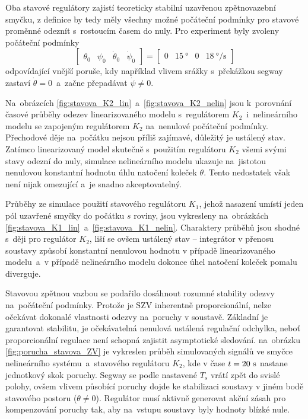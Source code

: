 \documentclass[conference]{IEEEtran}
\begin{document}
Oba stavové regulátory zajistí teoreticky stabilní uzavřenou zpětnovazební smyčku, z definice by tedy měly všechny možné počáteční
podmínky pro stavové proměnné odeznít s~rostoucím časem do nuly. Pro experiment byly zvoleny počáteční podmínky
\begin{equation*}
    \begin{bmatrix}
        \theta_0 & \psi_0 & \dot{\theta}_0 & \dot{\psi}_0
    \end{bmatrix} = \begin{bmatrix}
        0 & 15~\si{\degree} & 0 & 18~\si{\degree\per\second}
    \end{bmatrix}
\end{equation*}
odpovídající vnější poruše, kdy například vlivem srážky s~překážkou segway zastaví $\dot{\theta} = 0$~a~začne přepadávat $\dot{\psi} \neq 0$.


Na~obrázcích \ref{fig:stavova_K2_lin}~a~\ref{fig:stavova_K2_nelin}
jsou k~porovnání časové průběhy odezev linearizovaného modelu s~regulátorem $K_2$~i~nelineárního modelu se zapojeným regulátorem $K_2$ na~nenulové počáteční podmínky.
Přechodové děje na~počátku nejsou příliš zajímavé, důležitý je ustálený stav. Zatímco linearizovaný model skutečně s~použitím regulátoru $K_2$ všemi svými stavy 
odezní do nuly, simulace nelineárního modelu ukazuje na~jistotou nenulovou konstantní hodnotu úhlu natočení koleček $\theta$. Tento nedostatek však není nijak omezující
a~je snadno akceptovatelný. 


Průběhy ze simulace použití stavového regulátoru $K_1$, jehož nasazení umístí jeden pól uzavřené smyčky do počátku $s$ roviny, jsou vykresleny na~obrázkách 
\ref{fig:stavova_K1_lin}~a~\ref{fig:stavova_K1_nelin}. Charaktery průběhů jsou shodné s~ději pro regulátor $K_2$, liší se ovšem ustálený stav -- integrátor v přenosu
soustavy způsobí konstantní nenulovou hodnotu v případě linearizovaného modelu~a~v případě nelineárního modelu dokonce úhel natočení koleček pomalu diverguje.

Stavovou zpětnou vazbou se podařilo dosáhnout rozumné stability odezvy na~počáteční podmínky. Protože je SZV inherentně proporcionální, nelze očekávat
dokonalé vlastnosti odezvy na~poruchy v soustavě. Základní je garantovat stabilitu, je očekávatelná nenulová ustálená regulační odchylka,
neboť proporcionální regulace není schopná zajistit asymptotické sledování. na~obrázku \ref{fig:porucha_stavova_ZV} je vykreslen průběh simulovaných signálů ve smyčce nelineárního
systému~a~stavového regulátoru $K_2$, kde v čase $t = 20~\text{\si{\second}}$ nastane jednotkový skok poruchy.
Segway se podle nastavené $T_s$ vrátí zpět do svislé polohy, ovšem vlivem působící poruchy dojde ke stabilizaci soustavy v jiném bodě stavového postoru ($\theta \neq 0$).
Regulátor musí aktivně generovat akční zásah pro kompenzování poruchy tak, aby na~vstupu soustavy byly hodnoty blízké nule.
\end{document}
